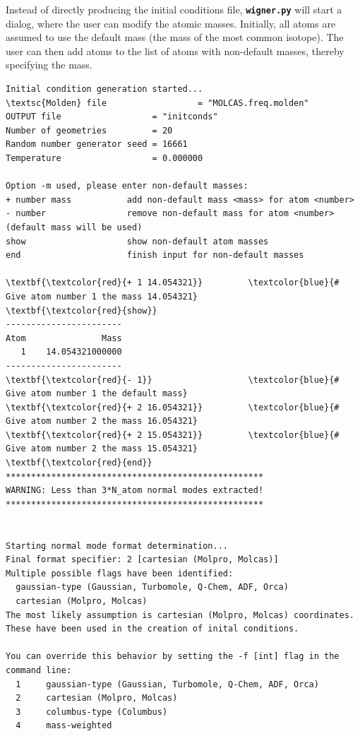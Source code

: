 \documentclass[a4paper,11pt,DIV=15,openany]{scrbook}
\newcommand{\ttt}[1]{\textbf{\texttt{#1}}}
\begin{document}
Instead of directly producing the initial conditions file, \ttt{wigner.py} will start a dialog, where the user can modify the atomic masses. Initially, all atoms are assumed to use the default mass (the mass of the most common isotope). The user can then add atoms to the list of atoms with non-default masses, thereby specifying the mass. 
\begin{oframed}
\footnotesize\begin{Verbatim}[commandchars=\\\{\}]
Initial condition generation started...
\textsc{Molden} file                  = "MOLCAS.freq.molden"
OUTPUT file                  = "initconds"
Number of geometries         = 20
Random number generator seed = 16661
Temperature                  = 0.000000

Option -m used, please enter non-default masses:
+ number mass           add non-default mass <mass> for atom <number>
- number                remove non-default mass for atom <number> (default mass will be used)
show                    show non-default atom masses
end                     finish input for non-default masses

\textbf{\textcolor{red}{+ 1 14.054321}}         \textcolor{blue}{# Give atom number 1 the mass 14.054321}
\textbf{\textcolor{red}{show}}
-----------------------
Atom               Mass
   1    14.054321000000
-----------------------
\textbf{\textcolor{red}{- 1}}                   \textcolor{blue}{# Give atom number 1 the default mass}
\textbf{\textcolor{red}{+ 2 16.054321}}         \textcolor{blue}{# Give atom number 2 the mass 16.054321}
\textbf{\textcolor{red}{+ 2 15.054321}}         \textcolor{blue}{# Give atom number 2 the mass 15.054321}
\textbf{\textcolor{red}{end}}
***************************************************
WARNING: Less than 3*N_atom normal modes extracted!
***************************************************


Starting normal mode format determination...
Final format specifier: 2 [cartesian (Molpro, Molcas)]
Multiple possible flags have been identified: 
  gaussian-type (Gaussian, Turbomole, Q-Chem, ADF, Orca) 
  cartesian (Molpro, Molcas)
The most likely assumption is cartesian (Molpro, Molcas) coordinates.
These have been used in the creation of inital conditions.

You can override this behavior by setting the -f [int] flag in the command line:
  1     gaussian-type (Gaussian, Turbomole, Q-Chem, ADF, Orca)
  2     cartesian (Molpro, Molcas)
  3     columbus-type (Columbus)
  4     mass-weighted


\end{Verbatim}
\end{oframed}
\end{document}
